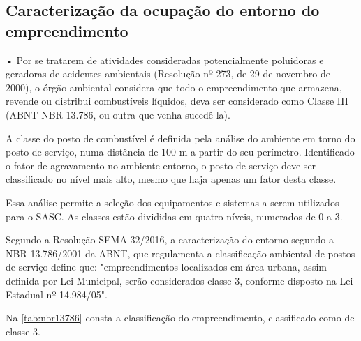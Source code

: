 \subsection{Caracterização da ocupação do entorno do 
empreendimento}

• Por se tratarem de atividades consideradas potencialmente 
poluidoras e geradoras de acidentes ambientais (Resolução 
nº 273, de 29 de novembro de 2000), o órgão ambiental 
considera que todo o empreendimento que armazena, revende 
ou distribui combustíveis líquidos, deva ser considerado 
como Classe III (ABNT NBR 13.786, ou outra que venha 
sucedê-la).

A classe do posto de combustível é definida pela análise do ambiente em torno do posto de serviço, numa distância de 100 m a partir do seu perímetro. Identificado o fator de agravamento no ambiente entorno, o posto de serviço deve ser classificado no nível mais alto, mesmo que haja apenas um fator desta classe. 

Essa análise permite a seleção dos equipamentos e sistemas a serem utilizados para o SASC.  As classes estão divididas em quatro níveis, numerados de 0 a 3.

Segundo a Resolução SEMA 32/2016, a caracterização do entorno segundo a NBR 13.786/2001 da ABNT, que regulamenta a classificação ambiental de postos de serviço define que: "empreendimentos localizados em área urbana, assim definida por Lei Municipal, serão considerados classe 3, conforme disposto na Lei Estadual nº 14.984/05".

Na \cref{tab:nbr13786} consta a classificação do empreendimento, classificado como de classe 3.


\setlength\LTleft{0pt}
\setlength\LTright{0pt}

